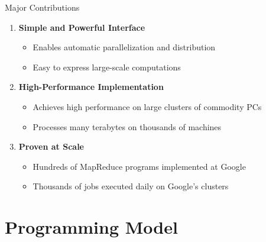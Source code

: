 \documentclass[aspectratio=169]{beamer}
\begin{document}
\begin{frame}{Major Contributions}
\begin{enumerate}
    \item \textbf{Simple and Powerful Interface}
    \begin{itemize}
        \item Enables automatic parallelization and distribution
        \item Easy to express large-scale computations
    \end{itemize}

    \vspace{0.3cm}

    \item \textbf{High-Performance Implementation}
    \begin{itemize}
        \item Achieves high performance on large clusters of commodity PCs
        \item Processes many terabytes on thousands of machines
    \end{itemize}

    \vspace{0.3cm}

    \item \textbf{Proven at Scale}
    \begin{itemize}
        \item Hundreds of MapReduce programs implemented at Google
        \item Thousands of jobs executed daily on Google's clusters
    \end{itemize}
\end{enumerate}
\end{frame}

\section{Programming Model}
\end{document}
